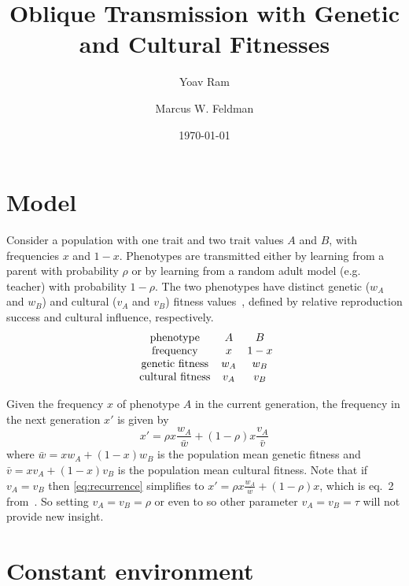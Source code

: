 \documentclass[12pt]{article} %
\title{Oblique Transmission with Genetic and Cultural Fitnesses}
\author{Yoav Ram}
\author{Marcus W. Feldman}
\affil{Department of Biology, Stanford University, Stanford, CA}
\date{\today}
\begin{document}
\maketitle

\section*{Model}

Consider a population with one trait and two trait values $A$ and $B$, with frequencies $x$ and $1-x$.
Phenotypes are transmitted either by learning from a parent with probability $\rho$ or by learning from a random adult model (e.g. teacher) with probability $1-\rho$.
The two phenotypes have distinct genetic ($w_A$ and $w_B$) and cultural ($v_A$ and $v_B$) fitness values~\citep{ElMouden2014}, defined by relative reproduction success and cultural influence, respectively.
\begin{equation} \label{eq:table}
\begin{array}{ccccc}
\hbox{ phenotype}&A&B\\
\hbox{ frequency}&x&1-x\\
\hbox{ genetic fitness}&w_A&w_B\\
\hbox{ cultural fitness}&v_A&v_B\\
\end{array}
\end{equation}

Given the frequency $x$ of phenotype $A$ in the current generation, the frequency in the next generation $x'$ is given by
\begin{equation} \label{eq:recurrence}
x' = \rho x \frac{w_A}{\bar w} + (1-\rho) x \frac{v_A}{\bar v} 
\end{equation}
where $\bar w = x w_A + (1-x) w_B$ is the population mean genetic fitness and $\bar v = x v_A + (1-x) v_B$ is the population mean cultural fitness. 
Note that if $v_A = v_B$ then \eqref{eq:recurrence} simplifies to 
$x' = \rho x \frac{w_A}{\bar w} + (1-\rho) x$,
which is eq.~2 from~\citet{Ram2018}.
So setting $v_A = v_B = \rho$ or even to so other parameter $v_A = v_B = \tau$ will not provide new insight.

\section*{Constant environment}
\end{document}

